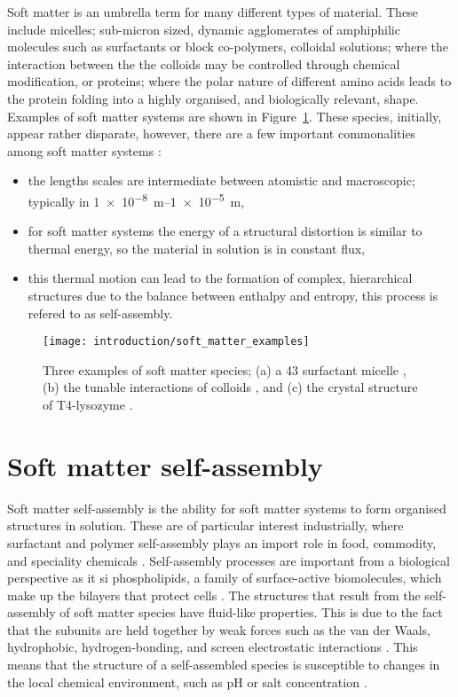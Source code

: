 Soft matter is an umbrella term for many different types of material.
These include micelles; sub-micron sized, dynamic agglomerates of amphiphilic molecules such as surfactants or block co-polymers, colloidal solutions; where the interaction between the the colloids may be controlled through chemical modification, or proteins; where the polar nature of different amino acids leads to the protein folding into a highly organised, and biologically relevant, shape.
Examples of soft matter systems are shown in Figure~\ref{fig:soft}.
These species, initially, appear rather disparate, however, there are a few important commonalities among soft matter systems \cite{jones_soft_2002}:
\begin{itemize}
  \item the lengths scales are intermediate between atomistic and macroscopic; typically in \SIrange{1e-8}{1e-5}{\meter},
  \item for soft matter systems the energy of a structural distortion is similar to thermal energy, so the material in solution is in constant flux,
  \item this thermal motion can lead to the formation of complex, hierarchical structures due to the balance between enthalpy and entropy, this process is refered to as self-assembly.
\end{itemize}
%
\begin{figure}
    \centering
    \texttt{[image: introduction/soft\_matter\_examples]}
    \caption{Three examples of soft matter species; (a) a 43  surfactant micelle \cite{hargreaves_atomistic_2011}, (b) the tunable interactions of colloids \cite{kraft_patchy_2011}, and (c) the crystal structure of T4-lysozyme \cite{rose_crystal_1988}.}
    \label{fig:soft}
\end{figure}
%

\section{Soft matter self-assembly}

Soft matter self-assembly is the ability for soft matter systems to form organised structures in solution.
These are of particular interest industrially, where surfactant and polymer self-assembly plays an import role in food, commodity, and speciality chemicals \cite{schramm_surfactants_2003}.
Self-assembly processes are important from a biological perspective as it si phospholipids, a family of surface-active biomolecules, which make up the bilayers that protect cells \cite{simons_lipid_2000}.
The structures that result from the self-assembly of soft matter species have fluid-like properties.
This is due to the fact that the subunits are held together by weak forces such as the van der Waals, hydrophobic, hydrogen-bonding, and screen electrostatic interactions \cite{israelachvili_intermolecular_2011}.
This means that the structure of a self-assembled species is susceptible to changes in the local chemical environment, such as pH or salt concentration \cite{schmaljohann_thermo-_2006,sammalkorpi_ionic_2009}.

